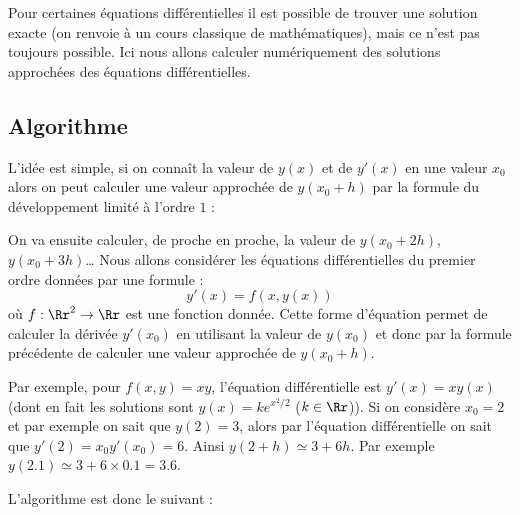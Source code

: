 \documentclass[11pt,class=report,crop=false]{standalone}
\begin{document}
Pour certaines équations différentielles il est possible de trouver une solution exacte (on renvoie à un cours classique de mathématiques), mais ce n'est pas toujours possible.
Ici nous allons calculer numériquement des solutions approchées des équations différentielles.

\subsection{Algorithme}


L'idée est simple, si on connaît la valeur de $y(x)$ et de $y'(x)$ en une valeur $x_0$ alors 
on peut calculer une valeur approchée de $y(x_0 + h)$ par la formule du développement limité à l'ordre $1$ :

On va ensuite calculer, de proche en proche, la valeur de $y(x_0+2h)$, $y(x_0+3h)$\dots{}
Nous allons considérer les équations différentielles du premier ordre données par une formule :
$$y'(x) = f(x,y(x))$$
où $f : \Rr^2 \to \Rr$ est une fonction donnée.
Cette forme d'équation permet de calculer la dérivée $y'(x_0)$ en utilisant la valeur de $y(x_0)$ et donc par la formule précédente de calculer une valeur approchée de $y(x_0+h)$.

Par exemple, pour $f(x,y) = xy$, l'équation différentielle est $y'(x) = x y(x)$ (dont en fait les solutions sont $y(x) = k e^{x^2/2}$ ($k \in \Rr$)).
Si on considère $x_0 = 2$ et par exemple on sait que $y(2) = 3$, alors par l'équation différentielle on sait que $y'(2) = x_0 y'(x_0) = 6$.
Ainsi $y(2+h) \simeq 3 + 6h$. Par exemple $y(2.1) \simeq 3 + 6 \times 0.1 = 3.6$.

\bigskip

L'algorithme est donc le suivant :\\
\end{document}
